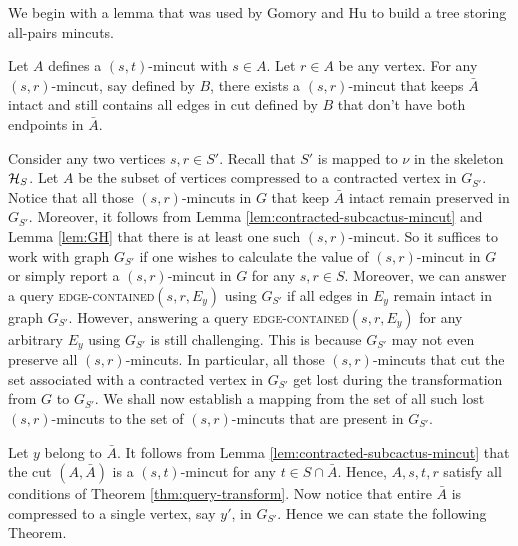 We begin with a lemma that was used by Gomory and Hu to build a tree storing all-pairs mincuts. 

\begin{lemma}
Let $A$ defines a $(s,t)$-mincut with $s\in A$. Let $r\in A$ be any vertex.
For any $(s,r)$-mincut, say defined by $B$, there exists a $(s,r)$-mincut that keeps $\bar A$ intact and still contains all edges in cut defined by $B$ that don't have both endpoints in $\bar A$.
\label{lem:GH}
\end{lemma}

Consider any two vertices $s,r\in S'$. Recall that $S'$ is mapped to $\nu$ in the skeleton ${\cal H}_S$. 
Let $A$ be the subset of vertices compressed to a contracted vertex in $G_{S'}$. Notice that all those $(s,r)$-mincuts in $G$ that keep $\bar{A}$ intact remain preserved in $G_{S'}$. Moreover, it follows from Lemma \ref{lem:contracted-subcactus-mincut} and Lemma \ref{lem:GH} that there is at least one such $(s,r)$-mincut. So it suffices to work with graph $G_{S'}$ if one wishes to calculate the value of $(s,r)$-mincut in $G$ or simply report a $(s,r)$-mincut in $G$
for any $s,r\in S$. Moreover, we can answer a query \textsc{edge-contained}$(s,r,E_y)$ using $G_{S'}$ if all edges in $E_y$ remain intact in graph $G_{S'}$. 
However, answering a query \textsc{edge-contained}$(s,r,E_{y})$ for any arbitrary $E_y$ using $G_{S'}$ is still challenging. This is because 
$G_{S'}$ may not even preserve all $(s,r)$-mincuts. In particular, all those $(s,r)$-mincuts that cut the set associated with a contracted vertex in $G_{S'}$ get lost during the transformation from $G$ to $G_{S'}$. We shall now establish a mapping from the set of all such lost $(s,r)$-mincuts to the set of $(s,r)$-mincuts that are present in $G_{S'}$. 

Let $y$ belong to $\bar{A}$. It follows from Lemma \ref{lem:contracted-subcactus-mincut} that the cut $(A,\bar{A})$ is a $(s,t)$-mincut for any $t\in S\cap \bar{A}$. Hence, $A,s,t,r$ satisfy all conditions of Theorem  \ref{thm:query-transform}. Now notice that entire $\bar{A}$
is compressed to a single vertex, say $y'$, in $G_{S'}$. Hence we can state the following Theorem.



